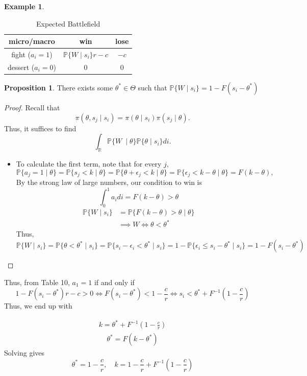 \documentclass[10pt, oneside]{article}
\newcommand{\bbR}{\mathbb{R}}
\newcommand{\bbP}{\mathbb{P}}
\theoremstyle{definition}
\newtheorem{exmp}{Example}[section]
\newtheorem{prop}{Proposition}
\begin{document}
\begin{exmp}
             \begin{table}[H]
        \centering
        \begin{tabular}{c|c|c}
            micro/macro & win & lose\\
             \hline
             fight ($a_i = 1$)& $\bbP\{W \mid s_i\}r -c$ & $-c$ \\
             \hline
             dessert ($a_i = 0$)&  $0$& $0$\\
        \end{tabular}
        \caption{Expected Battlefield}
    \end{table}
\begin{prop}
There exists some $\theta^* \in \Theta$ such that
    $\bbP\{W \mid s_i\} = 1-F(s_i - \theta ^*)$
\end{prop}
\begin{proof}
    Recall that 
    \[\pi(\theta,s_j \mid s_i) = \pi(\theta \mid s_i)\pi(s_j \mid \theta).\] Thus, it suffices to find 
    \[\int_{\bbR}\bbP\{W\ \mid \theta\}\bbP\{\theta \mid s_i\}di.\]
    \begin{itemize}
        \item To calculate the first term, note that for every $j,$
        \[\bbP\{a_j = 1 \mid \theta\} = \bbP\{s_j < k \mid \theta\} = \bbP\{\theta + \epsilon_j < k \mid \theta\} = \bbP\{\epsilon_j < k - \theta \mid \theta\} = F(k- \theta),\] By the strong law of large numbers, our condition to win is
        \[\int_0^1 a_i di = F(k-\theta) >\theta\]
        \begin{align*}
            \bbP\{W \mid s_i\} &= \bbP\{F(k- \theta) >\theta \mid \theta\}\\
            &\implies W \iff \theta < \theta^*
        \end{align*}
        Thus, 
        \[\bbP\{W \mid s_i\}  = \bbP\{\theta < \theta^* \mid s_i\} = \bbP\{s_i - \epsilon_i < \theta^* \mid s_i\} = 1- \bbP\{\epsilon_i \leq s_i - \theta^* \mid s_i\} = 1-F(s_i - \theta ^*)\]
    \end{itemize}
\end{proof}
Thus, from Table 10, $a_1 = 1$ if and only if 
\[1- F(s_i - \theta^*)r - c >0 \iff F(s_i - \theta^*) < 1 - \frac{c}{r} \iff s_i< \theta^*  +F^{-1}(1- \frac{c}{r})\] Thus, we end up with 

\begin{align}
    k = \theta^* + F^{-1}(1-\frac{c}{r})
\end{align}
\begin{align*}
    \theta^* = F(k - \theta^*)
\end{align*}
Solving gives
\[\theta^* = 1- \frac{c}{r}, \quad k = 1-\frac{c}{r} + F^{-1}(1 - \frac{c}{r})\]
\end{exmp}
\end{document}
